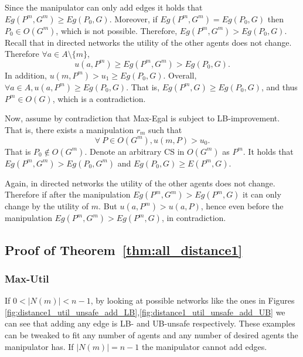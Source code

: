 Since the manipulator can only add edges it holds that $Eg(P^{m},G^m)\geq Eg(P_0,G)$. Moreover, if $Eg(P^{m},G^m)=Eg(P_0,G)$ then $P_{0}\in O(G^{m})$, which is not possible. Therefore, $Eg(P^{m},G^m)>Eg(P_0,G)$. Recall that in directed networks the utility of the other agents does not change. Therefore $\forall a \in A \setminus \{m\}$, \[
u(a,P^{m})  \geq Eg(P^{m},G^m) > Eg(P_0,G).
\]
In addition, $u(m,P^{m})>u_1\geq Eg(P_0,G)$. 
Overall, $\forall a \in A, u(a,P^{m}) \geq Eg(P_0,G)$. That is, $Eg(P^{m},G) \geq Eg(P_0,G)$, and thus $P^m\in O(G)$, which is a contradiction.


Now, assume by contradiction that Max-Egal is subject to LB-improvement.
That is, there exists a manipulation $r_{m}$ such that
\begin{equation} \label{ineq:egal_dir}
\forall \  P \in O(G^m), u(m,P) > u_0.
\end{equation} That is $P_0\notin O(G^m)$.
Denote an arbitrary CS in $O(G^m)$ as $P^m$. 
It holds that $Eg(P^m,G^m)>Eg(P_0,G^m)$ and $Eg(P_0,G)\geq E(P^m,G)$.

Again, in directed networks the utility of the other agents does not change. Therefore if after the manipulation $Eg(P^m,G^m)>Eg(P^m,G)$ it can only change by the utility of $m$. But $u(a,P^m)>u(a,P)$, hence even before the manipulation $Eg(P^m,G^m)>Eg(P^m,G)$, in contradiction.



\subsection*{Proof of Theorem~\ref{thm:all_distance1}}

\subsubsection*{Max-Util}
If $0<|N(m)|<n-1$, by looking at possible networks like the ones in Figures \ref{fig:distance1_util_unsafe_add_LB},\ref{fig:distance1_util_unsafe_add_UB} we can see that adding any edge is LB- and UB-unsafe respectively.
These examples can be tweaked to fit any number of agents and any number of desired agents the manipulator has.
If $|N(m)|=n-1$ the manipulator cannot add edges.



